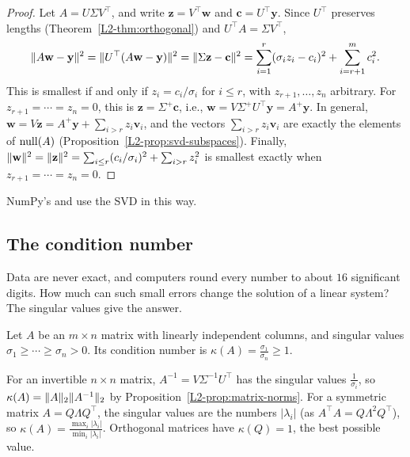 \begin{proof}
    Let $A = U\Sigma V^\top$, and write $\mathbf{z} = V^\top \mathbf{w}$ and $\mathbf{c} = U^\top \mathbf{y}$. Since $U^\top$ preserves lengths (Theorem~\ref{L2-thm:orthogonal}) and $U^\top A = \Sigma V^\top$,
    \[\lVert A\mathbf{w} - \mathbf{y} \rVert^2 = \lVert U^\top(A\mathbf{w} - \mathbf{y}) \rVert^2 = \lVert \Sigma \mathbf{z} - \mathbf{c} \rVert^2 = \sum_{i=1}^r (\sigma_i z_i - c_i)^2 + \sum_{i=r+1}^m c_i^2.\]
    This is smallest if and only if $z_i = c_i/\sigma_i$ for $i \leq r$, with $z_{r+1}, \ldots, z_n$ arbitrary. For $z_{r+1} = \cdots = z_n = 0$, this is $\mathbf{z} = \Sigma^+\mathbf{c}$, i.e., $\mathbf{w} = V\Sigma^+U^\top \mathbf{y} = A^+\mathbf{y}$. In general, $\mathbf{w} = V\mathbf{z} = A^+\mathbf{y} + \sum_{i > r} z_i\mathbf{v}_i$, and the vectors $\sum_{i > r} z_i\mathbf{v}_i$ are exactly the elements of $\operatorname{null}(A)$ (Proposition~\ref{L2-prop:svd-subspaces}). Finally, $\lVert \mathbf{w} \rVert^2 = \lVert \mathbf{z} \rVert^2 = \sum_{i \leq r}(c_i/\sigma_i)^2 + \sum_{i > r} z_i^2$ is smallest exactly when $z_{r+1} = \cdots = z_n = 0$.
\end{proof}

NumPy's  and  use the SVD in this way.

\subsection{The condition number}\label{L2-sec:condition}

Data are never exact, and computers round every number to about $16$ significant digits. How much can such small errors change the solution of a linear system? The singular values give the answer.

\begin{definition}
    Let $A$ be an $m \times n$ matrix with linearly independent columns, and singular values $\sigma_1 \geq \cdots \geq \sigma_n > 0$. Its condition number is $\kappa(A) = \frac{\sigma_1}{\sigma_n} \geq 1$.
\end{definition}

For an invertible $n \times n$ matrix, $A^{-1} = V\Sigma^{-1}U^\top$ has the singular values $\frac{1}{\sigma_i}$, so $\kappa(A) = \lVert A \rVert_2\lVert A^{-1} \rVert_2$ by Proposition~\ref{L2-prop:matrix-norms}. For a symmetric matrix $A = Q\Lambda Q^\top$, the singular values are the numbers $|\lambda_i|$ (as $A^\top A = Q\Lambda^2Q^\top$), so $\kappa(A) = \frac{\max_i|\lambda_i|}{\min_i|\lambda_i|}$. Orthogonal matrices have $\kappa(Q) = 1$, the best possible value.

